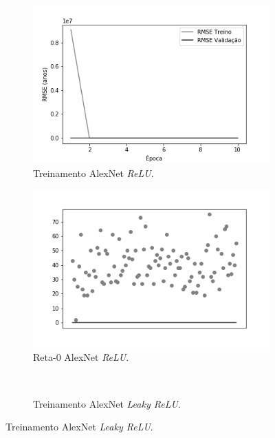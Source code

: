 \begin{figure}[hb!]
	\caption{Resultados do treinamento e teste da CNN AlexNet.}\label{fig:alexnet-abordagem1}
	\begin{subfigure}[hb]{0.5\linewidth}
		\caption{Treinamento AlexNet \emph{ReLU}.}
		\label{fig:redeneuralbiologica}
		\includegraphics[width=\linewidth]{img/graficos-fase2/fig-history-alexnet-relu-data-augmentation-2-1.png}
	\end{subfigure}
  \begin{subfigure}[hb]{0.5\linewidth}
    \caption{Reta-0 AlexNet \emph{ReLU}.}
    \label{fig:redeneuralbiologica}
    \includegraphics[width=\linewidth]{img/graficos-fase2/fig-reta-0-alexnet-relu-data-augmentation-2-1.png}%
  \end{subfigure}\\
	\begin{subfigure}[hb]{0.5\linewidth}
		\caption{Treinamento AlexNet \emph{Leaky ReLU}.}

\end{subfigure}
\end{figure}
